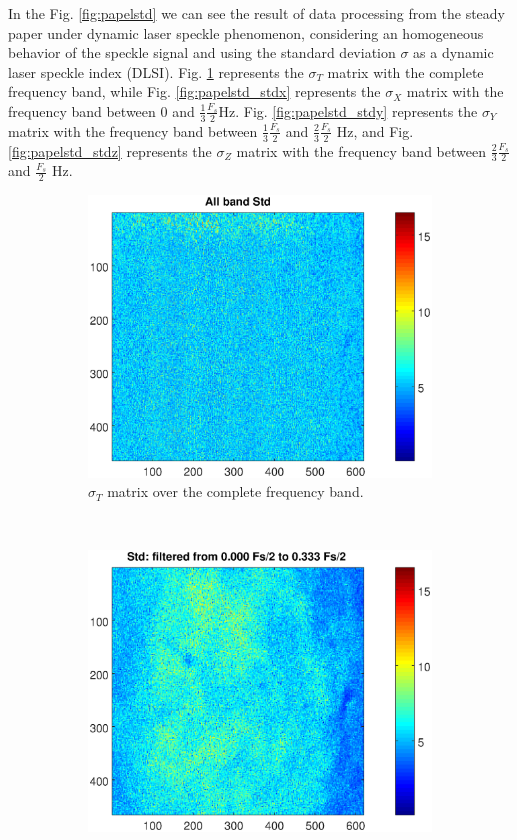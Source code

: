\documentclass[review]{elsarticle}
\begin{document}
In the Fig. \ref{fig:papelstd} we can see the result of data processing from the steady
 paper under dynamic laser speckle phenomenon, 
considering an homogeneous behavior of the speckle signal and using the standard deviation $\sigma$ as a dynamic laser speckle index (DLSI). 
Fig. \ref{fig:papelall} represents the $\sigma_T$ matrix with the complete frequency band, while Fig. \ref{fig:papelstd_stdx}
represents the $\sigma_X$ matrix with the frequency band between $0$ and $\frac{1}{3}\frac{F_s}{2}$Hz.
Fig. \ref{fig:papelstd_stdy} represents the $\sigma_Y$ matrix with the frequency band between $\frac{1}{3}\frac{F_s}{2}$ and $\frac{2}{3}\frac{F_s}{2}$ Hz, and Fig. \ref{fig:papelstd_stdz} 
represents the $\sigma_Z$ matrix with the frequency band between $\frac{2}{3}\frac{F_s}{2}$ and $\frac{F_s}{2}$ Hz.
\begin{figure}[h!]
    \centering
    \begin{subfigure}[b]{0.485\textwidth}
        \includegraphics[width=\textwidth]{stdall.eps}
	\caption{$\sigma_T$ matrix over the complete frequency band.}
        \label{fig:papelall}
    \end{subfigure}
    ~
    \begin{subfigure}[b]{0.465\textwidth}
        \includegraphics[width=\textwidth]{stdx.eps}

\end{subfigure}
\end{figure}
\end{document}
